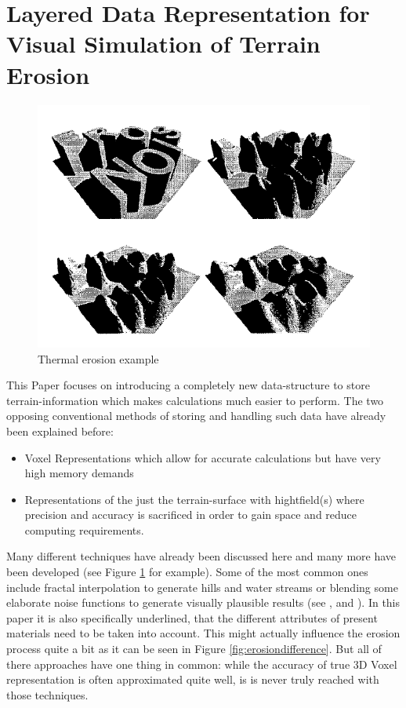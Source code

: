 \section{Layered Data Representation for Visual Simulation of Terrain Erosion}


\begin{figure}[htb]
	\centering
	\includegraphics[width=\linewidth]{MGG_10/snap2.png}
	\caption{Thermal erosion example}
	\label{fig:thermal_erosion}
\end{figure}

This Paper \cite{marechal2010heat} focuses on introducing a completely new data-structure to store terrain-information which makes calculations much easier to perform. The two opposing conventional methods of storing and handling such data have already been explained before:
\begin{itemize}
	\item Voxel Representations which allow for accurate calculations but have very high memory demands
	\item Representations of the just the terrain-surface with hightfield(s) where precision and accuracy is sacrificed in order to gain space and reduce computing requirements.
\end{itemize}

Many different techniques have already been discussed here and many more have been developed (see Figure \ref{fig:thermal_erosion} for example). Some of the most common ones include fractal interpolation to generate hills and water streams \cite{kelley1988terrain} or blending some elaborate noise functions to generate visually plausible results (see \cite{eckbert2000simulating}, \cite{musgrave1989synthesis} and \cite{musgrave1999towards}). In this paper it is also specifically underlined, that the different attributes of present materials need to be taken into account. This might actually influence the erosion process quite a bit as it can be seen in Figure \ref{fig:erosiondifference}. But all of there approaches have one thing in common: while the accuracy of true 3D Voxel representation is often approximated quite well, is is never truly reached with those techniques.

